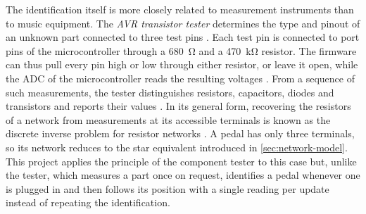 The identification itself is more closely related to measurement instruments than to music equipment. The \emph{AVR transistor tester} determines the type and pinout of an unknown part connected to three test pins \cite{frejek2011avr}. Each test pin is connected to port pins of the microcontroller through a \qty{680}{\ohm} and a \qty{470}{\kilo\ohm} resistor. The firmware can thus pull every pin high or low through either resistor, or leave it open, while the ADC of the microcontroller reads the resulting voltages \cite{frejek2011avr, kuebbeler2023transistortester}. From a sequence of such measurements, the tester distinguishes resistors, capacitors, diodes and transistors and reports their values \cite{kuebbeler2023transistortester}. In its general form, recovering the resistors of a network from measurements at its accessible terminals is known as the discrete inverse problem for resistor networks \cite{curtis1990determining, curtis2000inverse}. A pedal has only three terminals, so its network reduces to the star equivalent introduced in \cref{sec:network-model}. This project applies the principle of the component tester to this case but, unlike the tester, which measures a part once on request, identifies a pedal whenever one is plugged in and then follows its position with a single reading per update instead of repeating the identification.
